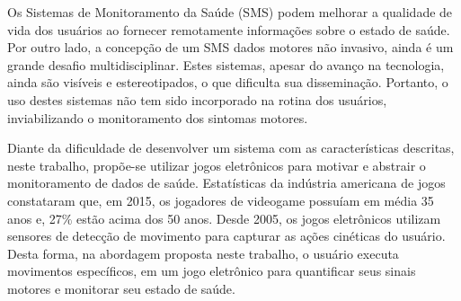 


Os Sistemas de Monitoramento da Saúde (SMS) podem melhorar a qualidade de vida dos usuários ao fornecer remotamente informações sobre o estado de saúde. Por outro lado, a concepção de um SMS dados motores não invasivo, ainda é um grande desafio multidisciplinar. Estes sistemas, apesar do avanço na tecnologia, ainda são visíveis e estereotipados, o que dificulta sua disseminação. Portanto, o uso destes sistemas não tem sido incorporado na rotina dos usuários, inviabilizando o monitoramento dos sintomas motores.
 
Diante da dificuldade de desenvolver um sistema com as características descritas, neste trabalho, propõe-se utilizar jogos eletrônicos para motivar e abstrair o monitoramento de dados de saúde. Estatísticas da indústria americana de jogos constataram que, em 2015, os jogadores de videogame possuíam em média 35 anos e, 27$\%$  estão acima dos 50 anos. Desde 2005, os jogos eletrônicos utilizam sensores de detecção de movimento para capturar as ações cinéticas do usuário. Desta forma, na abordagem proposta neste trabalho, o usuário executa movimentos específicos, em um jogo eletrônico para quantificar seus sinais motores e monitorar seu estado de saúde.

